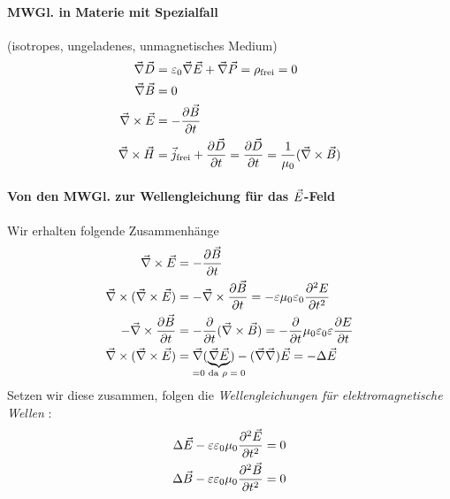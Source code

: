 \paragraph{MWGl. in Materie mit Spezialfall}(isotropes, ungeladenes, unmagnetisches Medium)
\begin{align*}
  \vecna\vecD&=\epso\vecna\vecE+\vecna\vecP=\rho_\text{frei}=0\\
  \vecna\vecB&=0\\
  \vecna\times\vecE&=-\dif[\vecB]{t}\\
  \vecna\times\vecH&=\vecj_\text{frei}+\dif[\vecD]{t}
                     =\dif[\vecD]{t}=\frac{1}{\muo}(\vecna\times\vecB)
\end{align*}
\paragraph{Von den MWGl. zur Wellengleichung für das $\vecE$-Feld}
Wir erhalten folgende Zusammenhänge
\begin{align*}
  \vecna \times \vecE 
  &=-\dif[\vecB]{t}
  \\
  \vecna \times (\vecna\times\vecE)
  &=-\vecna\times\dif[\vecB]{t}
    =-\eps\muo\epso\diff[E]{t}
  \\
  -\vecna \times \dif[\vecB]{t}
  &= -\dif[]{t}(\vecna\times\vecB)
    = -\dif[]{t}\muo\epso\eps\dif[E]{t}
  \\
  \vecna\times(\vecna\times\vecE)
  &=\vecna(\underbrace{\vecna\vecE}_{\mathclap{=0 \text{ da $\rho=0$}}})
    -(\vecna\vecna)\vecE
    =-\Delta\vecE
\end{align*}
Setzen wir diese zusammen, folgen die
\emph{Wellengleichungen für elektromagnetische Wellen}%
:
\begin{align*}
  \Delta\vecE-\eps\epso\muo\diff[\vecE]{t} &= 0\\
  \Delta\vecB-\eps\epso\muo\diff[\vecB]{t} &= 0
\end{align*}
